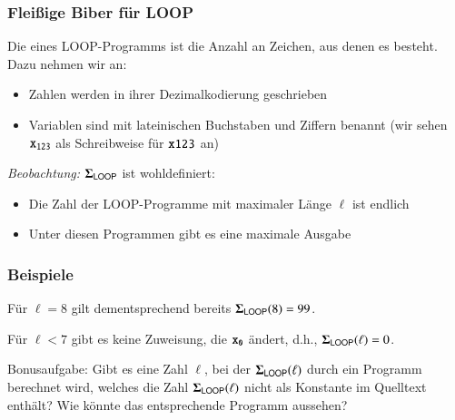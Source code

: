 \documentclass[onlymath]{beamer}
\begin{document}
\begin{frame}\frametitle{Fleißige Biber für LOOP}

Die  eines LOOP-Programms ist die Anzahl an
Zeichen, aus denen es besteht. Dazu nehmen wir an:
\begin{itemize}
\item Zahlen werden in ihrer Dezimalkodierung geschrieben
\item Variablen sind mit lateinischen Buchstaben und Ziffern benannt (wir sehen $\texttt{x}_{\texttt{123}}$ als Schreibweise für $\texttt{x123}$ an)
\end{itemize}\bigskip\pause

\pause

\emph{Beobachtung:} $\boldsymbol{\Sigma}_{\textsf{LOOP}}$ ist wohldefiniert:
\begin{itemize}
\item Die Zahl der LOOP-Programme mit maximaler Länge $\ell$ ist endlich
\item Unter diesen Programmen gibt es eine maximale Ausgabe
\end{itemize}

\end{frame}

\begin{frame}\frametitle{Beispiele}

\medskip\pause

Für $\ell=8$ gilt dementsprechend bereits $\boldsymbol{\Sigma}_{\textsf{LOOP}}(8)=99$.
\medskip

Für $\ell<7$ gibt es keine Zuweisung, die $\texttt{x}_{\texttt{0}}$ ändert, d.h., $\boldsymbol{\Sigma}_{\textsf{LOOP}}(\ell)=0$.
\bigskip\pause

\alert{Bonusaufgabe:} Gibt es eine Zahl $\ell$, bei der $\boldsymbol{\Sigma}_{\textsf{LOOP}}(\ell)$ durch ein
Programm berechnet wird, welches die Zahl $\boldsymbol{\Sigma}_{\textsf{LOOP}}(\ell)$ nicht
als Konstante im Quelltext enthält? Wie könnte das entsprechende Programm aussehen?


\end{frame}
\end{document}
